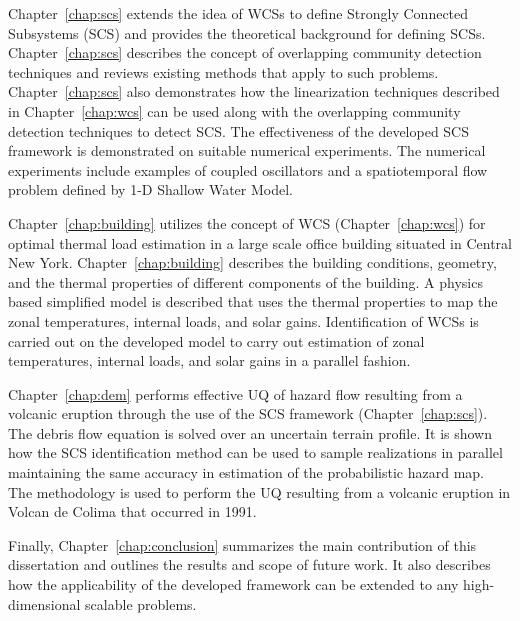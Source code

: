 Chapter~\ref{chap:scs} extends the idea of WCSs to define Strongly Connected Subsystems (SCS) and provides the theoretical background for defining SCSs. Chapter~\ref{chap:scs} describes the concept of overlapping community detection techniques and reviews existing methods that apply to such problems. Chapter~\ref{chap:scs} also demonstrates how the linearization techniques described in Chapter~\ref{chap:wcs} can be used along with the overlapping community detection techniques to detect SCS. The effectiveness of the developed SCS framework is demonstrated on suitable numerical experiments. The numerical experiments include examples of coupled oscillators and a spatiotemporal flow problem defined by 1-D Shallow Water Model.  


Chapter~\ref{chap:building} utilizes the concept of WCS (Chapter~\ref{chap:wcs}) for optimal thermal load estimation in a large scale office building situated in Central New York. Chapter~\ref{chap:building} describes the building conditions, geometry, and the thermal properties of different components of the building. A physics based simplified model is described that uses the thermal properties to map the zonal temperatures, internal loads, and solar gains. Identification of WCSs is carried out on the developed model to carry out estimation of zonal temperatures, internal loads, and solar gains in a parallel fashion.


Chapter~\ref{chap:dem} performs effective UQ of hazard flow resulting from a volcanic eruption through the use of the SCS framework (Chapter~\ref{chap:scs}). The debris flow equation is solved over an uncertain terrain profile. It is shown how the SCS identification method can be used to sample realizations in parallel maintaining the same accuracy in estimation of the probabilistic hazard map. The methodology is used to perform the UQ resulting from a volcanic eruption in Volcan de Colima that occurred in 1991. 


Finally, Chapter~\ref{chap:conclusion} summarizes the main contribution of this dissertation and outlines the results and scope of future work. It also describes how the applicability of the developed framework can be extended to any high-dimensional scalable problems.  



























